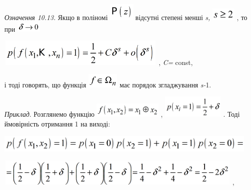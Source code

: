 \textit{Означення 10.13.} Якщо в поліномі 
\includegraphics[width=0.4945in,height=0.3429in]{crypt-img/crypt-img246.png} 
відсутні степені менші \textit{s}\textit{, }
\includegraphics[width=0.4701in,height=0.248in]{crypt-img/crypt-img247.png} ,
то при 
\includegraphics[width=0.472in,height=0.1937in]{crypt-img/crypt-img248.png} 

{\centering
 \includegraphics[width=3.2417in,height=0.5193in]{crypt-img/crypt-img249.png} , 
\textit{C}\textit{=} const,
\par}

і тоді говорять, що функція 
\includegraphics[width=0.6173in,height=0.2909in]{crypt-img/crypt-img250.png} 
має порядок згладжування  \textit{s}\textit{{}-}1.

\textit{Приклад}. Розглянемо функцію
\includegraphics[width=1.3193in,height=0.278in]{crypt-img/crypt-img251.png} , 
\includegraphics[width=1.1937in,height=0.4307in]{crypt-img/crypt-img252.png} .
Тоді ймовірність отримання 1 на виході:

{\centering 
\includegraphics[width=5.1161in,height=0.3429in]{crypt-img/crypt-img253.png}
\par}

{\centering
 \includegraphics[width=4.8161in,height=0.5091in]{crypt-img/crypt-img254.png} ,
\par}

